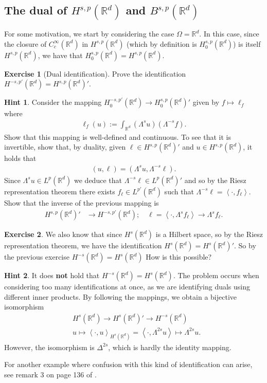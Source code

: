 \documentclass[
    a4paper,
    DIV=14,
    abstract=true,
    numbers=noenddot
]
{scrartcl}
\theoremstyle{definition}
\newtheorem{exercise}{Exercise}
\newtheorem*{hint}{Hint}
\newcommand{\br}[1]{\left\langle#1\right\rangle}
\newcommand{\R}{\mathbb{R}}
\begin{document}
\subsection{The dual of $H^{s,p}(\R^d)$ and $B^{s,p}(\R^d)$}
For some motivation, we start by considering the case $\Omega =\R^d$. In this case, since the closure of
$C_c^\infty(\R^d)$ in $H^{s,p}(\R^d)$ (which by definition is $H_0^{s,p}(\R^d)$) is itself $H^{s,p}(\R^d)$, we have that $H_0^{s,p}(\R^d)=H^{s,p}(\R^d)$.
\begin{exercise}[Dual identification]\label{dual exercise}
    Prove the identification $H^{-s,p'}(\R^d)=H^{s,p}(\R^d)'$.
\end{exercise}
\begin{hint}

    Consider the mapping  $H_0^{-s,p'}(\R^d) \to H^{s,p}_0(\R^d)'$ given by $f \mapsto \ell_f$ where
    \begin{align*}
        \ell_f(u):= \int_{\R^d}(\Lambda^s u)(\Lambda ^{-s}f).
    \end{align*}
    Show that this mapping is well-defined and continuous. To see that it is invertible, show that, by duality, given $\ell \in H^{s,p}(\R^d)'$ and $u \in H^{s,p}(\R^d)$, it holds that
    \begin{align*}
        (u,\ell )=(\Lambda ^s u,\Lambda ^{-s}\ell ).
    \end{align*}
    Since $ \Lambda ^s u \in L^p(\R^d)$ we deduce that $\Lambda ^{-s}\ell \in L^{p}(\R^d)'$ and so by the Riesz representation theorem there exists $f_\ell \in L^{p'}(\R^d)$ such that $\Lambda ^{-s}\ell =\br{\cdot,f_\ell}$. Show that the inverse of the previous mapping is
    \begin{align*}
        H^{s,p}(\R^d)'                & \longrightarrow H^{-s,p'}(\R^d); \quad \ell = \br{\cdot, \Lambda^s  f_\ell} \to \Lambda^s  f_\ell.\end{align*}
\end{hint}
\begin{exercise}
    We also know that since $H^{s}(\R^d)$ is a Hilbert space, so by the Riesz representation theorem, we have the identification $H^s(\R^d) = H^{s}(\R^d)'$. So by the previous exercise $H^{-s}(\R^d)= H^s(\R^d)$ How is this possible?
\end{exercise}
\begin{hint}
    It does \textbf{not} hold that $H^{-s}(\R^d)= H^s(\R^d)$. The problem occurs when considering too many identifications at once, as we are identifying duals using different inner products. By following the mappings, we obtain a bijective isomorphism
    \begin{align*}
         & H^{s}(\R^d) \to  H^s(\R^d)' \to H^{-s}(\R^d)                                                    \\
         & u \longmapsto   \br{\cdot, u}_{H^s(\R^d)}= \br{\cdot, \Lambda^{2s} u } \mapsto \Lambda ^{2s} u.
    \end{align*}
    However, the isomorphism is $\Delta ^{2s}$, which is hardly the identity mapping.
\end{hint}
For another example where confusion with this kind of identification can arise, see remark 3 on page  136 of \cite{brezis2011functional}.
\end{document}
